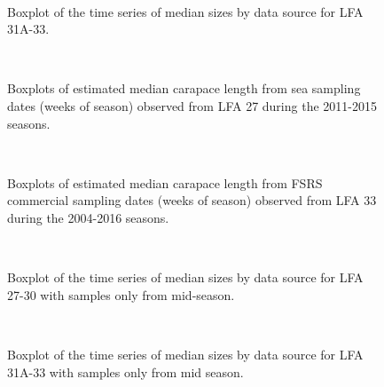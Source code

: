 \documentclass[11pt]{article}
\newcommand{\e}{/backup/bio_data/bio.lobster/figures/} %
\begin{document}
\begin{figure}
        \centering
         \\
                     \caption{Boxplot of the time series of median sizes by data source for LFA 31A-33.}
        \end{figure}


\begin{figure}
        \centering
         \\
                     \caption{Boxplots of estimated median carapace length from sea sampling dates (weeks of season) observed from LFA 27 during the 2011-2015 seasons. }
        \end{figure}

\begin{figure}
        \centering
         \\
                     \caption{Boxplots of estimated median carapace length from FSRS commercial sampling dates (weeks of season) observed from LFA 33 during the 2004-2016 seasons. }
        \end{figure}

\begin{figure}
        \centering
         \\
                     \caption{Boxplot of the time series of median sizes by data source for LFA 27-30 with samples only from mid-season.}
        \end{figure}

\begin{figure}
        \centering
         \\
                     \caption{Boxplot of the time series of median sizes by data source for LFA 31A-33 with samples only from mid season.}
        \end{figure}
\end{document}
